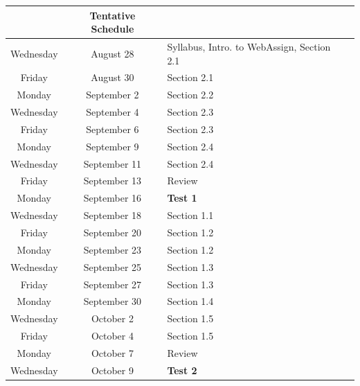 \documentclass[12pt]{article}
\begin{document}
\thispagestyle{empty}
\begin{center}
\begin{tabular}{|c|c|l|l|}
\hline
&\textbf{Tentative Schedule}&\\
 \hline
Wednesday & August 28 & Syllabus, Intro. to WebAssign, Section 2.1\\

\hline
Friday & August 30 & Section 2.1\\

\hline
Monday & September 2 & Section 2.2\\

\hline
Wednesday & September 4 &Section 2.3\\

\hline
Friday & September 6 & Section 2.3\\

 \hline
Monday & September 9& Section 2.4\\

 \hline
Wednesday & September 11& Section 2.4\\

 \hline
Friday &September 13 & Review \\

 \hline
Monday & September 16& \textbf{Test 1}\\

 \hline
Wednesday & September 18& Section 1.1\\

 \hline
Friday &September 20 & Section 1.2 \\

 \hline
Monday & September 23& Section 1.2\\

 \hline
Wednesday & September 25& Section 1.3\\

 \hline
Friday &September 27 & Section 1.3 \\

 \hline
Monday & September 30& Section 1.4\\

 \hline
Wednesday & October 2& Section 1.5\\

 \hline
Friday & October 4 & Section 1.5 \\

 \hline
Monday & October 7 & Review\\

\hline
Wednesday & October 9 & \textbf{Test 2}\\


\end{tabular}
\end{center}
\end{document}
